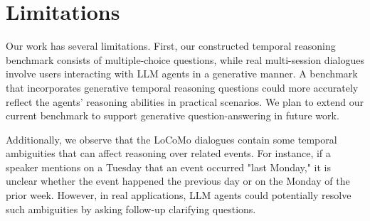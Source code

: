 \section{Limitations}
Our work has several limitations. First, our constructed temporal reasoning benchmark consists of multiple-choice questions, while real multi-session dialogues involve users interacting with LLM agents in a generative manner. A benchmark that incorporates generative temporal reasoning questions could more accurately reflect the agents' reasoning abilities in practical scenarios. We plan to extend our current benchmark to support generative question-answering in future work.

Additionally, we observe that the LoCoMo dialogues contain some temporal ambiguities that can affect reasoning over related events. For instance, if a speaker mentions on a Tuesday that an event occurred "last Monday," it is unclear whether the event happened the previous day or on the Monday of the prior week. However, in real applications, LLM agents could potentially resolve such ambiguities by asking follow-up clarifying questions.